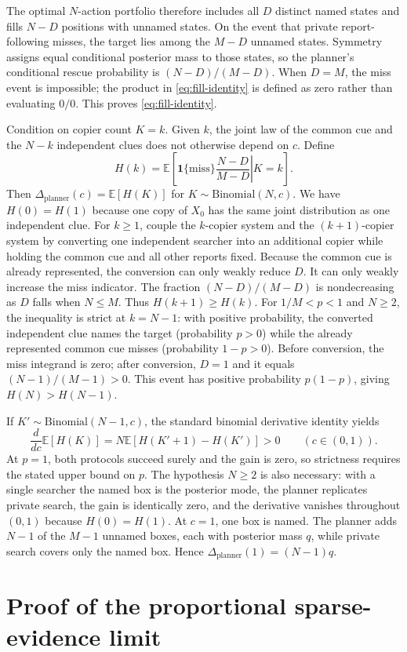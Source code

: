 \documentclass[11pt]{article}
\theoremstyle{definition}
\theoremstyle{remark}
\newcommand{\E}{\mathbb{E}}
\newcommand{\1}{\mathbf{1}}
\newcommand{\plan}{\mathrm{planner}}
\begin{document}
The optimal $N$-action portfolio therefore includes all $D$ distinct named states and fills $N-D$ positions with unnamed states. On the event that private report-following misses, the target lies among the $M-D$ unnamed states. Symmetry assigns equal conditional posterior mass to those states, so the planner's conditional rescue probability is $(N-D)/(M-D)$. When $D=M$, the miss event is impossible; the product in \cref{eq:fill-identity} is defined as zero rather than evaluating $0/0$. This proves \cref{eq:fill-identity}.

Condition on copier count $K=k$. Given $k$, the joint law of the common cue and the $N-k$ independent clues does not otherwise depend on $c$. Define
\[
H(k)=\E\left[\left.\1\{\text{miss}\}\frac{N-D}{M-D}\right|K=k\right].
\]
Then $\Delta_{\plan}(c)=\E[H(K)]$ for $K\sim\mathrm{Binomial}(N,c)$. We have $H(0)=H(1)$ because one copy of $X_0$ has the same joint distribution as one independent clue. For $k\ge1$, couple the $k$-copier system and the $(k+1)$-copier system by converting one independent searcher into an additional copier while holding the common cue and all other reports fixed. Because the common cue is already represented, the conversion can only weakly reduce $D$. It can only weakly increase the miss indicator. The fraction $(N-D)/(M-D)$ is nondecreasing as $D$ falls when $N\le M$. Thus $H(k+1)\ge H(k)$. For $1/M<p<1$ and $N\ge2$, the inequality is strict at $k=N-1$: with positive probability, the converted independent clue names the target (probability $p>0$) while the already represented common cue misses (probability $1-p>0$). Before conversion, the miss integrand is zero; after conversion, $D=1$ and it equals $(N-1)/(M-1)>0$. This event has positive probability $p(1-p)$, giving $H(N)>H(N-1)$.

If $K'\sim\mathrm{Binomial}(N-1,c)$, the standard binomial derivative identity yields
\[
\frac{d}{dc}\E[H(K)]
=N\E[H(K'+1)-H(K')]>0
\qquad(c\in(0,1)).
\]
At $p=1$, both protocols succeed surely and the gain is zero, so strictness requires the stated upper bound on $p$. The hypothesis $N\ge2$ is also necessary: with a single searcher the named box is the posterior mode, the planner replicates private search, the gain is identically zero, and the derivative vanishes throughout $(0,1)$ because $H(0)=H(1)$.
At $c=1$, one box is named. The planner adds $N-1$ of the $M-1$ unnamed boxes, each with posterior mass $q$, while private search covers only the named box. Hence $\Delta_{\plan}(1)=(N-1)q$.

\section{Proof of the proportional sparse-evidence limit}
\label{app:scaling}
\end{document}
